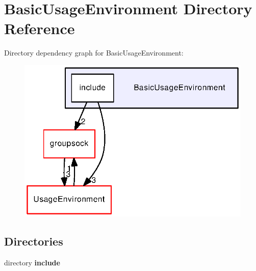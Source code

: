 \section{Basic\+Usage\+Environment Directory Reference}
\label{dir_47f8a58a7ea1f9b80362240285156746}
Directory dependency graph for Basic\+Usage\+Environment\+:
\nopagebreak
\begin{figure}[H]
\begin{center}
\leavevmode
\includegraphics[width=323pt]{dir_47f8a58a7ea1f9b80362240285156746_dep}
\end{center}
\end{figure}
\subsection*{Directories}
\begin{DoxyCompactItemize}
\item 
directory {\bf include}
\end{DoxyCompactItemize}
